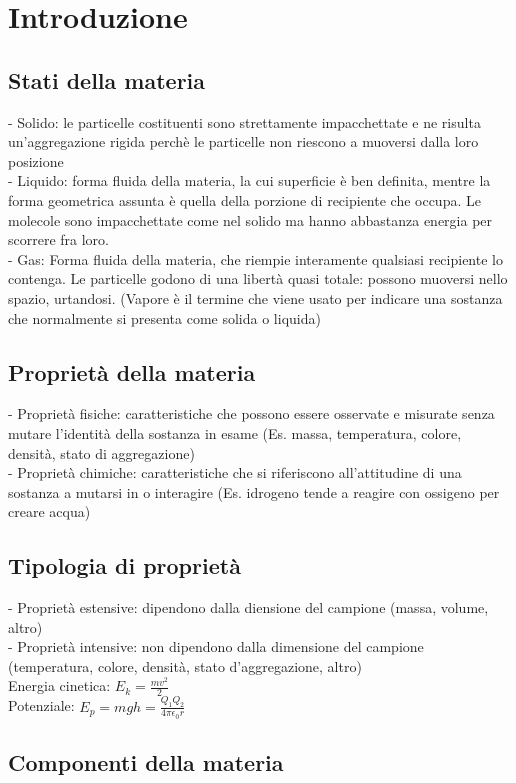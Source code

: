 \section{Introduzione}
\subsection{Stati della materia}
- Solido: le particelle costituenti sono strettamente impacchettate e ne risulta un'aggregazione rigida perchè le particelle non riescono a muoversi dalla loro posizione\\
- Liquido: forma fluida della materia, la cui superficie è ben definita, mentre la forma geometrica assunta è quella della porzione di recipiente che occupa. Le molecole sono impacchettate come nel solido ma hanno abbastanza energia per scorrere fra loro.\\
- Gas: Forma fluida della materia, che riempie interamente qualsiasi recipiente lo contenga. Le particelle godono di una libertà quasi totale: possono muoversi nello spazio, urtandosi. (Vapore è il termine che viene usato per indicare una sostanza che normalmente si presenta come solida o liquida)
\subsection{Proprietà della materia}
- Proprietà fisiche: caratteristiche che possono essere osservate e misurate senza mutare l'identità della sostanza in esame (Es. massa, temperatura, colore, densità, stato di aggregazione)\\
- Proprietà chimiche: caratteristiche che si riferiscono all'attitudine di una sostanza a mutarsi in o interagire (Es. idrogeno tende a reagire con ossigeno per creare acqua)
\subsection{Tipologia di proprietà}
- Proprietà estensive: dipendono dalla diensione del campione (massa, volume, altro)\\
- Proprietà intensive: non dipendono dalla dimensione del campione (temperatura, colore, densità, stato d'aggregazione, altro)\\
Energia cinetica: $E_k = \frac{mv^2}{2}$\\
Potenziale: $E_p = mgh = \frac{Q_1 Q_2}{4\pi\epsilon_0 r}$
\subsection{Componenti della materia}

